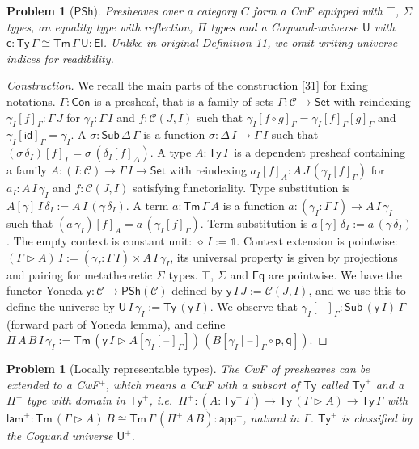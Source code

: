 \documentclass[10pt,a4paper]{amsart}
\newtheorem{problem}[theorem]{Problem}
\providecommand{\vmathbb}[1]{\mathbb{#1}}
\newcommand{\Ty}{\mathsf{Ty}}
\newcommand{\Tm}{\mathsf{Tm}}
\newcommand{\Set}{\mathsf{Set}}
\newcommand{\U}{\mathsf{U}}
\newcommand{\El}{\mathsf{El}}
\newcommand{\ra}{\rightarrow}
\newcommand{\blank}{\mathord{\hspace{1pt}\text{--}\hspace{1pt}}} %
\newcommand{\lam}{\mathsf{lam}}
\newcommand{\app}{\mathsf{app}}
\newcommand{\Con}{\mathsf{Con}}
\newcommand{\Sub}{\mathsf{Sub}}
\newcommand{\ext}{\operatorname{\triangleright}}
\newcommand{\p}{\mathsf{p}}
\newcommand{\q}{\mathsf{q}}
\newcommand{\id}{\mathsf{id}}
\newcommand{\Eq}{\mathsf{Eq}}
\newcommand{\C}{\mathcal{C}}
\newcommand{\PSh}{\mathsf{PSh}}
\newcommand{\y}{\mathsf{y}}
\newcommand{\code}{\mathsf{c}}
\begin{document}
\begin{problem}[$\PSh$]\label{prob:presheaf}
  Presheaves over a category $C$ form a CwF equipped with $\top$, $\Sigma$ types,
  an equality type with reflection, $\Pi$ types and a Coquand-universe
  $\U$ with $\code:\Ty\,\Gamma\cong\Tm\,\Gamma\,\U:\El$. Unlike in
  original Definition 11, we omit writing universe indices for
  readibility.
\end{problem}
\begin{proof}[Construction]
  We recall the main parts of the construction
  [31] for fixing notations.  $\Gamma:\Con$ is a
  presheaf, that is a family of sets $\Gamma:\C\ra\Set$ with
  reindexing $\gamma_I[f]_\Gamma : \Gamma\,J$ for $\gamma_I:\Gamma\,I$
  and $f:\C(J,I)$ such that $\gamma_I[f\circ g]_\Gamma =
  \gamma_I[f]_\Gamma[g]_\Gamma$ and $\gamma_I[\id]_\Gamma =
  \gamma_I$. A $\sigma:\Sub\,\Delta\,\Gamma$ is a function $\sigma :
  \Delta\,I\ra\Gamma\,I$ such that $(\sigma\,\delta_I)[f]_\Gamma =
  \sigma\,(\delta_I[f]_\Delta)$. A type $A:\Ty\,\Gamma$ is a dependent
  presheaf containing a family $A : (I:\C)\ra\Gamma\,I\ra\Set$ with
  reindexing $a_I[f]_A : A\,J\,(\gamma_I[f]_\Gamma)$ for
  $a_I:A\,I\,\gamma_I$ and $f:\C(J,I)$ satisfying functoriality. Type
  substitution is $A[\gamma]\,I\,\delta_I :=
  A\,I\,(\gamma\,\delta_I)$. A term $a:\Tm\,\Gamma\,A$ is a function
  $a : (\gamma_I:\Gamma\,I)\ra A\,I\,\gamma_I$ such that
  $(a\,\gamma_I)[f]_A = a\,(\gamma_I[f]_\Gamma)$. Term substitution is
  $a[\gamma]\,\delta_I := a\,(\gamma\,\delta_I)$. The empty context is
  constant unit: $\diamond\,I := \vmathbb{1}$. Context extension is
  pointwise: $(\Gamma\ext A)\,I := (\gamma_I:\Gamma\,I)\times
  A\,I\,\gamma_I$, its universal property is given by projections and
  pairing for metatheoretic $\Sigma$ types. $\top$, $\Sigma$ and $\Eq$
  are pointwise. We have the functor Yoneda $\y : \C\ra\PSh(\C)$
  defined by $\y\,I\,J := \C(J,I)$, and we use this to define the
  universe by $\U\,I\,\gamma_I := \Ty\,(\y\,I)$. We observe that
  $\gamma_I[\blank]_\Gamma : \Sub\,(\y\,I)\,\Gamma$ (forward part of
  Yoneda lemma), and define $\Pi\,A\,B\,I\,\gamma_I := \Tm\,(\y\,I\ext
  A[\gamma_I[\blank]_\Gamma])\,(B[\gamma_I[\blank]_\Gamma\circ\p,\q])$.
\end{proof}
\begin{problem}[Locally representable types]
  The CwF of presheaves can be extended to a CwF$^+$, which means a
  CwF with a subsort of $\Ty$ called $\Ty^+$ and a $\Pi^+$ type with
  domain in $\Ty^+$, i.e.\ $\Pi^+ :
  (A:\Ty^+\,\Gamma)\ra\Ty\,(\Gamma\ext A)\ra\Ty\,\Gamma$ with $\lam^+
  : \Tm\,(\Gamma\ext A)\,B\cong\Tm\,\Gamma\,(\Pi^+\,A\,B) : \app^+$,
  natural in $\Gamma$. $\Ty^+$ is classified by the Coquand universe
  $\U^+$.
\end{problem}
\end{document}
